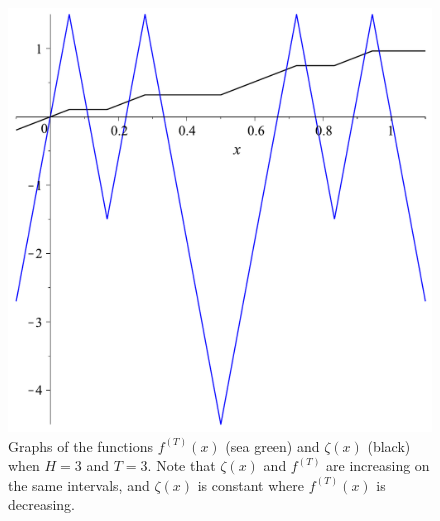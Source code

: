 \documentclass[12pt,a4paper]{amsart}
\begin{document}
\begin{figure}[h!]
\centering
\includegraphics[scale=0.28]{Fig12}
\caption{Graphs of the functions $f^{(T)}(x)$ (sea green) and $\zeta (x)$ (black) when  $H=3$ and  $T=3$.  
Note that $\zeta(x)$ and $f^{(T)}$ are increasing on the same intervals, and $\zeta(x)$ is constant where $f^{(T)}(x)$ is decreasing.} \label{f12}
\end{figure}
\end{document}
